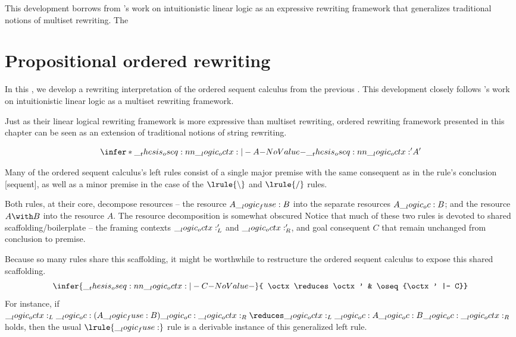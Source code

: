 This development borrows from \citeauthor{Cervesato+Scedrov:IC09}'s work on intuitionistic linear logic as an expressive rewriting framework that generalizes traditional notions of multiset rewriting.\autocite{Cervesato+Scedrov:IC09}
The 

\section{Propositional ordered rewriting}

In this , we develop a rewriting interpretation of the ordered sequent calculus from the previous .
This development closely follows \citeauthor{Cervesato+Scedrov:IC09}'s work on intuitionistic linear logic as a multiset rewriting framework.\autocite{Cervesato+Scedrov:IC09}

Just as their linear logical rewriting framework is more expressive than multiset rewriting, ordered rewriting framework presented in this chapter can be seen as an extension of traditional notions of string rewriting.


\begin{equation*}
  \infer*{\oseq{\octx |- A}}{
    \oseq{\octx' |- A'}}
\end{equation*}


Many of the ordered sequent calculus's left rules consist of a single major premise with the same consequent as in the rule's conclusion [sequent], as well as a minor premise in the case of the $\lrule{\limp}$ and $\lrule{\pmir}$ rules.
Both rules, at their core, decompose resources -- the resource $A \__logic_fuse: B$ into the separate resources $A \__logic_oc: B$; and the resource $A \with B$ into the resource $A$.
The resource decomposition is somewhat obscured 
Notice that much of these two rules is devoted to shared scaffolding/boilerplate -- the framing contexts $\__logic_octx:'_L$ and $\__logic_octx:'_R$, and goal consequent $C$ that remain unchanged from conclusion to premise.

Because so many rules share this scaffolding, it might be worthwhile to restructure the ordered sequent calculus to expose this shared scaffolding.
\begin{equation*}
  \infer{\oseq{\octx |- C}}{
    \octx \reduces \octx' & \oseq{\octx' |- C}}
\end{equation*}
For instance, if $\octx_L \oc (A \fuse B) \oc \octx_R \reduces \octx_L \oc A \oc B \oc \octx_R$ holds, then the usual $\lrule{\fuse}$ rule is a derivable instance of this generalized left rule.

